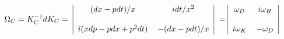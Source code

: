 \begin{equation}\label{Cbose}
\begin{tabular}{c|cc|c}
  & $(dx-pdt)/x$ & $idt/x^2$&\\
$\!\!\!\!\!\Omega_C=K_C^{-1}dK_C=$&&&\\
  & $i(x dp-p dx + p^2dt)$ &
$-(dx-pdt)/x$&\\
\end{tabular}\\ \!\!\!\!\!\!\!
\begin{tabular}{c|cc|c}
       & $\omega_{D}$ & $i\omega_{H}$&\\
$=\!\!$&               &               &\\
       & $i\omega_{K}$ &$-\omega_{D}$&\\
\end{tabular}\\
\end{equation}

